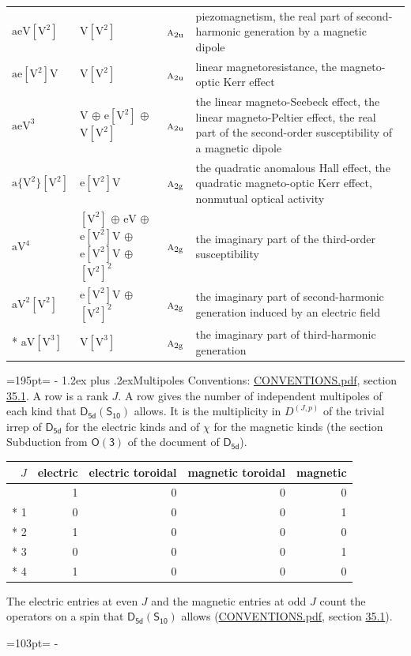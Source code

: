 \documentclass[10pt,a4paper]{article}
\makeatletter
\renewcommand\section{\@startsection{section}{1}{\z@}{-3ex plus -1ex minus -.2ex}%
  {1.2ex plus .2ex}{\normalfont\large\sffamily\bfseries\color{parttitle}}}
\newcommand{\needspace}[1]{\par\penalty-100\begingroup\dimen0=#1\relax\dimen2=\pagegoal
  \advance\dimen2-\pagetotal\ifdim\dimen0>\dimen2\relax\ifdim\dimen2>0pt\vfil\break\fi\fi
  \endgroup}
\numberwithin{equation}{section}
\newcommand{\grp}[1]{\mathsf{#1}}
\newcommand{\irr}[1]{\text{\normalfont\scshape #1}}
\newcommand{\ptag}[1]{\mathrm{#1}}
\newcommand{\irrJp}[2]{D^{(#1,#2)}}
\newcommand{\jahn}[1]{\mathrm{#1}}
\newlength{\fillwidth}\newlength{\cellwidth}\newlength{\colwidth}
\makeatother
\begin{document}
{\begin{longtable}{@{}lll>{\RaggedRight\arraybackslash}p{\fillwidth}@{}}
$\jahn{aeV[V^{2}]}$ & $\jahn{V[V^{2}]}$ & $\irr{a}_{2\ptag{u}}$ & piezomagnetism, the real part of second-harmonic generation by a magnetic dipole\\
$\jahn{ae[V^{2}]V}$ & $\jahn{V[V^{2}]}$ & $\irr{a}_{2\ptag{u}}$ & linear magnetoresistance, the magneto-optic Kerr effect\\
$\jahn{aeV^{3}}$ & $\jahn{V}$ $\oplus$ $\jahn{e[V^{2}]}$ $\oplus$ $\jahn{V[V^{2}]}$ & $\irr{a}_{2\ptag{u}}$ & the linear magneto-Seebeck effect, the linear magneto-Peltier effect, the real part of the second-order susceptibility of a magnetic dipole\\
$\jahn{a\{V^{2}\}[V^{2}]}$ & $\jahn{e[V^{2}]V}$ & $\irr{a}_{2\ptag{g}}$ & the quadratic anomalous Hall effect, the quadratic magneto-optic Kerr effect, nonmutual optical activity\\
$\jahn{aV^{4}}$ & $\jahn{[V^{2}]}$ $\oplus$ $\jahn{eV}$ $\oplus$ $\jahn{e[V^{2}]V}$ $\oplus$ $\jahn{e[V^{2}]V}$ $\oplus$ $\jahn{[V^{2}]^{2}}$ & $\irr{a}_{2\ptag{g}}$ & the imaginary part of the third-order susceptibility\\
$\jahn{aV^{2}[V^{2}]}$ & $\jahn{e[V^{2}]V}$ $\oplus$ $\jahn{[V^{2}]^{2}}$ & $\irr{a}_{2\ptag{g}}$ & the imaginary part of second-harmonic generation induced by an electric field\\*
$\jahn{aV[V^{3}]}$ & $\jahn{V[V^{3}]}$ & $\irr{a}_{2\ptag{g}}$ & the imaginary part of third-harmonic generation\\
\bottomrule\end{longtable}}
\needspace{195pt}
\section{Multipoles}\label{s:multipoles}
Conventions: \href{../../CONVENTIONS.pdf}{CONVENTIONS.pdf}, section \href{../../CONVENTIONS.pdf\#conv.35.1}{35.1}.
A row is a rank $J$. \label{n:head.multipole.electric}\label{n:head.multipole.electric.toroidal}\label{n:head.multipole.magnetic.toroidal}\label{n:head.multipole.magnetic}A row gives the number of independent multipoles of each kind that $\grp{D_{5d}}(\grp{S_{10}})$ allows. It is the multiplicity in $\irrJp{J}{p}$ of the trivial irrep of $\grp{D_{5d}}$ for the electric kinds and of $\chi$ for the magnetic kinds (the section Subduction from $\grp{O(3)}$ of the document of \href{../../../rotation/data/pdf/D5d.pdf}{$\grp{D_{5d}}$}).
{\small\begin{longtable}{@{}rrrrr@{}}\toprule
$J$ & electric & electric toroidal & magnetic toroidal & magnetic\\\midrule\endhead
\bottomrule\endfoot\endlastfoot
0 & 1 & 0 & 0 & 0\\*
1 & 0 & 0 & 0 & 1\\*
2 & 1 & 0 & 0 & 0\\*
3 & 0 & 0 & 0 & 1\\*
4 & 1 & 0 & 0 & 0\\
\bottomrule\end{longtable}}
The electric entries at even $J$ and the magnetic entries at odd $J$ count the operators on a spin that $\grp{D_{5d}}(\grp{S_{10}})$ allows (\href{../../CONVENTIONS.pdf}{CONVENTIONS.pdf}, section \href{../../CONVENTIONS.pdf\#conv.35.1}{35.1}).
\needspace{103pt}
\end{document}
